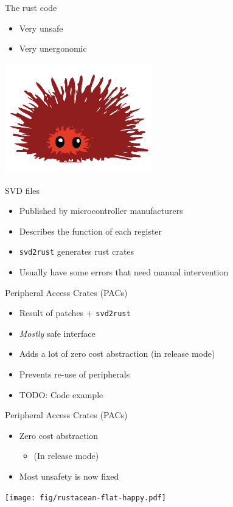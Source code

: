 \documentclass[169]{beamer}
\begin{document}
\begin{frame}{The rust code}
    \begin{itemize}
        \item Very unsafe
        \item Very unergonomic
    \end{itemize}
    \hspace*{5cm}\includegraphics[width=0.48\textwidth]{fig/unsafe.png}
\end{frame}

\begin{frame}{SVD files}
    \begin{itemize}
        \item{Published by microcontroller manufacturers}
        \item{Describes the function of each register}
        \item{\texttt{svd2rust} generates rust crates}
        \item{Usually have some errors that need manual intervention}
    \end{itemize}
\end{frame}

\begin{frame}{Peripheral Access Crates (PACs)}
    \begin{itemize}
        \item{Result of patches + \texttt{svd2rust}}
        \item{\textit{Mostly} safe interface}
        \item{Adds a lot of zero cost abstraction (in release mode)}
        \item{Prevents re-use of peripherals}
        \item{TODO: Code example}
    \end{itemize}
\end{frame}

\begin{frame}{Peripheral Access Crates (PACs)}
    \begin{itemize}
        \item{Zero cost abstraction}
        \begin{itemize}\item{(In release mode)}\end{itemize}
        \item{Most unsafety is now fixed}
    \end{itemize}
    \hspace*{5cm}\texttt{[image: fig/rustacean-flat-happy.pdf]}
\end{frame}
\end{document}
